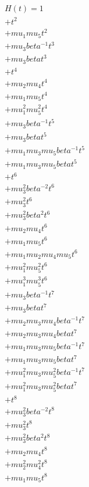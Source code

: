 \begin{align*}
H(t) = {}1 \\
  + t^{2} \\
  + mu_1 mu_5 t^{2} \\
  + mu_3 beta^{-1} t^{3} \\
  + mu_3 beta t^{3} \\
  + t^{4} \\
  + mu_2 mu_4 t^{4} \\
  + mu_1 mu_5 t^{4} \\
  + mu_1^{2} mu_5^{2} t^{4} \\
  + mu_3 beta^{-1} t^{5} \\
  + mu_3 beta t^{5} \\
  + mu_1 mu_3 mu_5 beta^{-1} t^{5} \\
  + mu_1 mu_3 mu_5 beta t^{5} \\
  + t^{6} \\
  + mu_3^{2} beta^{-2} t^{6} \\
  + mu_3^{2} t^{6} \\
  + mu_3^{2} beta^{2} t^{6} \\
  + mu_2 mu_4 t^{6} \\
  + mu_1 mu_5 t^{6} \\
  + mu_1 mu_2 mu_4 mu_5 t^{6} \\
  + mu_1^{2} mu_5^{2} t^{6} \\
  + mu_1^{3} mu_5^{3} t^{6} \\
  + mu_3 beta^{-1} t^{7} \\
  + mu_3 beta t^{7} \\
  + mu_2 mu_3 mu_4 beta^{-1} t^{7} \\
  + mu_2 mu_3 mu_4 beta t^{7} \\
  + mu_1 mu_3 mu_5 beta^{-1} t^{7} \\
  + mu_1 mu_3 mu_5 beta t^{7} \\
  + mu_1^{2} mu_3 mu_5^{2} beta^{-1} t^{7} \\
  + mu_1^{2} mu_3 mu_5^{2} beta t^{7} \\
  + t^{8} \\
  + mu_3^{2} beta^{-2} t^{8} \\
  + mu_3^{2} t^{8} \\
  + mu_3^{2} beta^{2} t^{8} \\
  + mu_2 mu_4 t^{8} \\
  + mu_2^{2} mu_4^{2} t^{8} \\
  + mu_1 mu_5 t^{8} \\

\end{align*}
